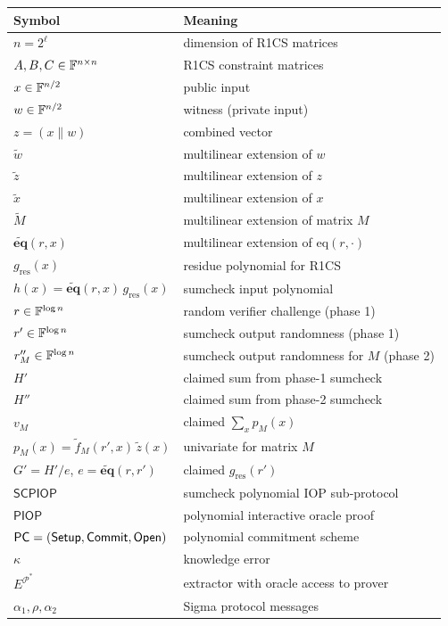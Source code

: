 \documentclass[11pt]{article}
\newcommand{\tildew}{\tilde{w}}
\newcommand{\tildeq}{\tilde{\mathbf{eq}}}
\newcommand{\tildez}{\tilde{z}}
\newcommand{\tildex}{\tilde{x}}
\newcommand{\tildeM}{\widetilde{M}}
\begin{document}
\begin{center}
\begin{tabular}{ll}
  \hline
  \textbf{Symbol} & \textbf{Meaning} \\
  \hline
  $n = 2^\ell$ & dimension of R1CS matrices \\
  $A, B, C \in \mathbb{F}^{n\times n}$ & R1CS constraint matrices \\
  $x \in \mathbb{F}^{n/2}$ & public input \\
  $w \in \mathbb{F}^{n/2}$ & witness (private input) \\
  $z = (x \| w)$ & combined vector \\
  $\tildew$ & multilinear extension of $w$ \\
  $\tildez$ & multilinear extension of $z$ \\
  $\tildex$ & multilinear extension of $x$ \\
  $\tildeM$ & multilinear extension of matrix $M$ \\
  $\tildeq(r, x)$ & multilinear extension of $\mathrm{eq}(r, \cdot)$ \\
  $g_{\mathrm{res}}(x)$ & residue polynomial for R1CS \\
  $h(x) = \tildeq(r,x)\,g_{\mathrm{res}}(x)$ & sumcheck input polynomial \\
  $r \in \mathbb{F}^{\log n}$ & random verifier challenge (phase 1) \\
  $r' \in \mathbb{F}^{\log n}$ & sumcheck output randomness (phase 1) \\
  $r''_M \in \mathbb{F}^{\log n}$ & sumcheck output randomness for $M$ (phase 2) \\
  $H'$ & claimed sum from phase-1 sumcheck \\
  $H''$ & claimed sum from phase-2 sumcheck \\
  $v_M$ & claimed $\sum_x p_M(x)$ \\
  $p_M(x) = \tilde{f}_M(r',x)\,\tildez(x)$ & univariate for matrix $M$ \\
  $G' = H'/e$, $e = \tildeq(r,r')$ & claimed $g_{\mathrm{res}}(r')$ \\
  $\mathsf{SCPIOP}$ & sumcheck polynomial IOP sub-protocol \\
  $\mathsf{PIOP}$ & polynomial interactive oracle proof \\
  $\mathsf{PC} = (\mathsf{Setup}, \mathsf{Commit}, \mathsf{Open})$ & polynomial commitment scheme \\
  $\kappa$ & knowledge error \\
  $E^{\mathcal{P}^*}$ & extractor with oracle access to prover \\
  $\alpha_1, \rho, \alpha_2$ & Sigma protocol messages \\
  \hline
\end{tabular}
\end{center}
\end{document}
